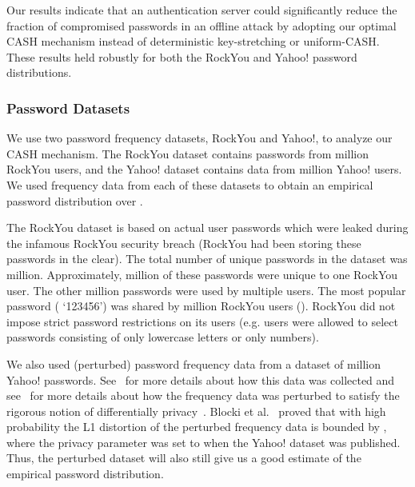 Our results indicate that an authentication server could significantly reduce the fraction of compromised passwords in an offline attack by adopting our optimal CASH mechanism instead of deterministic key-stretching or uniform-CASH. These results held robustly for both the RockYou and Yahoo! password distributions.






\subsubsection{Password Datasets} \label{subsubsec:RockYou} We use two password frequency datasets, RockYou and Yahoo!, to analyze our CASH mechanism. The RockYou dataset contains passwords from  million RockYou users, and the Yahoo! dataset contains data from  million Yahoo! users. We used frequency data from each of these datasets to obtain an empirical password distribution  over . 

The RockYou dataset is based on actual user passwords which were leaked during the infamous RockYou security breach (RockYou had been storing these passwords in the clear). The total number of unique passwords in the dataset was  million. Approximately,  million of these passwords were unique to one RockYou user. The other  million passwords were used by multiple users. The most popular password ( `123456') was shared by  million RockYou users (). RockYou did not impose strict password restrictions on its users (e.g. users were allowed to select passwords consisting of only lowercase letters or only numbers). 

We also used (perturbed) password frequency data from a dataset of  million Yahoo! passwords. See~\cite{bonneau2012science} for more details about how this data was collected and see~\cite{blocki2016differentially} for more details about how the frequency data was perturbed to satisfy the rigorous notion of differentially privacy~\cite{dwork2006calibrating}. Blocki et al.~\cite{blocki2016differentially} proved that with high probability the L1 distortion of the perturbed frequency data is bounded by , where the privacy parameter was set to  when the Yahoo! dataset was published. Thus, the perturbed dataset will also still give us a good estimate of the empirical password distribution.  

